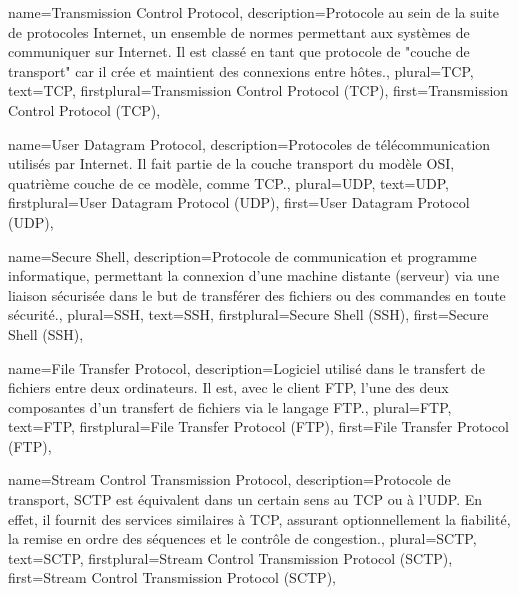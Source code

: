 {
name={Transmission Control Protocol},
description={Protocole au sein de la suite de protocoles Internet, un ensemble de normes
        permettant aux systèmes de communiquer sur Internet. Il est classé en tant que protocole de
        "couche de transport" car il crée et maintient des connexions entre hôtes.},
plural={TCP},
text={TCP},
firstplural={Transmission Control Protocol (TCP)},
first={Transmission Control Protocol (TCP)},
}

{
name={User Datagram Protocol},
description={Protocoles de télécommunication utilisés par Internet. Il fait partie de la couche
        transport du modèle OSI, quatrième couche de ce modèle, comme \gls{TCP}.},
plural={UDP},
text={UDP},
firstplural={User Datagram Protocol (UDP)},
first={User Datagram Protocol (UDP)},
}

{
name={Secure Shell},
description={Protocole de communication et programme informatique, permettant la connexion d'une
        machine distante (serveur) via une liaison sécurisée dans le but de transférer des fichiers
        ou des commandes en toute sécurité.},
plural={SSH},
text={SSH},
firstplural={Secure Shell (SSH)},
first={Secure Shell (SSH)},
}

{
name={File Transfer Protocol},
description={Logiciel utilisé dans le transfert de fichiers entre deux ordinateurs. Il est, avec le
        client FTP, l'une des deux composantes d'un transfert de fichiers via le langage FTP.},
plural={FTP},
text={FTP},
firstplural={File Transfer Protocol (FTP)},
first={File Transfer Protocol (FTP)},
}

{
name={Stream Control Transmission Protocol},
description={Protocole de transport, SCTP est équivalent dans un certain sens au \gls{TCP} ou à
        l'\gls{UDP}. En effet, il fournit des services similaires à \gls{TCP}, assurant
        optionnellement la fiabilité, la remise en ordre des séquences et le contrôle de congestion.},
plural={SCTP},
text={SCTP},
firstplural={Stream Control Transmission Protocol (SCTP)},
first={Stream Control Transmission Protocol (SCTP)},
}

